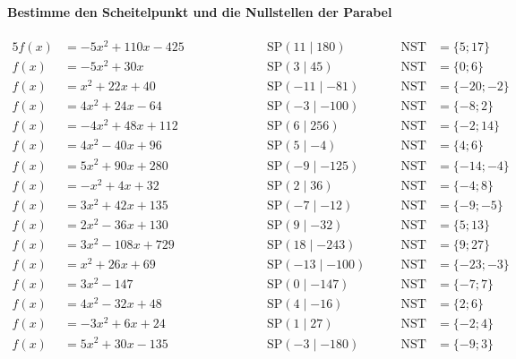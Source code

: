 \documentclass
[
  draft    = true,
  fontsize = 11pt,
  parskip  = half-,
  BCOR     = 0pt,
  DIV      = 11
]
{scrartcl}
\begin{document}
\paragraph{Bestimme den Scheitelpunkt und die Nullstellen der Parabel}
\begin{alignat*}{5}
  f(x)&=-5x^{2}+110x-425 \qquad&\qquad \quad&\text{SP}(11\mid180) \quad&\quad \text{NST}&=\{5;17\} \\[0.5ex]
  f(x)&=-5x^{2}+30x \qquad&\qquad \quad&\text{SP}(3\mid45) \quad&\quad \text{NST}&=\{0;6\} \\[0.5ex]
  f(x)&=x^{2}+22x+40 \qquad&\qquad \quad&\text{SP}(-11\mid-81) \quad&\quad \text{NST}&=\{-20;-2\} \\[0.5ex]
  f(x)&=4x^{2}+24x-64 \qquad&\qquad \quad&\text{SP}(-3\mid-100) \quad&\quad \text{NST}&=\{-8;2\} \\[0.5ex]
  f(x)&=-4x^{2}+48x+112 \qquad&\qquad \quad&\text{SP}(6\mid256) \quad&\quad \text{NST}&=\{-2;14\} \\[0.5ex]
  f(x)&=4x^{2}-40x+96 \qquad&\qquad \quad&\text{SP}(5\mid-4) \quad&\quad \text{NST}&=\{4;6\} \\[0.5ex]
  f(x)&=5x^{2}+90x+280 \qquad&\qquad \quad&\text{SP}(-9\mid-125) \quad&\quad \text{NST}&=\{-14;-4\} \\[0.5ex]
  f(x)&=-x^{2}+4x+32 \qquad&\qquad \quad&\text{SP}(2\mid36) \quad&\quad \text{NST}&=\{-4;8\} \\[0.5ex]
  f(x)&=3x^{2}+42x+135 \qquad&\qquad \quad&\text{SP}(-7\mid-12) \quad&\quad \text{NST}&=\{-9;-5\} \\[0.5ex]
  f(x)&=2x^{2}-36x+130 \qquad&\qquad \quad&\text{SP}(9\mid-32) \quad&\quad \text{NST}&=\{5;13\} \\[0.5ex]
  f(x)&=3x^{2}-108x+729 \qquad&\qquad \quad&\text{SP}(18\mid-243) \quad&\quad \text{NST}&=\{9;27\} \\[0.5ex]
  f(x)&=x^{2}+26x+69 \qquad&\qquad \quad&\text{SP}(-13\mid-100) \quad&\quad \text{NST}&=\{-23;-3\} \\[0.5ex]
  f(x)&=3x^{2}-147 \qquad&\qquad \quad&\text{SP}(0\mid-147) \quad&\quad \text{NST}&=\{-7;7\} \\[0.5ex]
  f(x)&=4x^{2}-32x+48 \qquad&\qquad \quad&\text{SP}(4\mid-16) \quad&\quad \text{NST}&=\{2;6\} \\[0.5ex]
  f(x)&=-3x^{2}+6x+24 \qquad&\qquad \quad&\text{SP}(1\mid27) \quad&\quad \text{NST}&=\{-2;4\} \\[0.5ex]
  f(x)&=5x^{2}+30x-135 \qquad&\qquad \quad&\text{SP}(-3\mid-180) \quad&\quad \text{NST}&=\{-9;3\} \\[0.5ex]

\end{alignat*}
\end{document}

